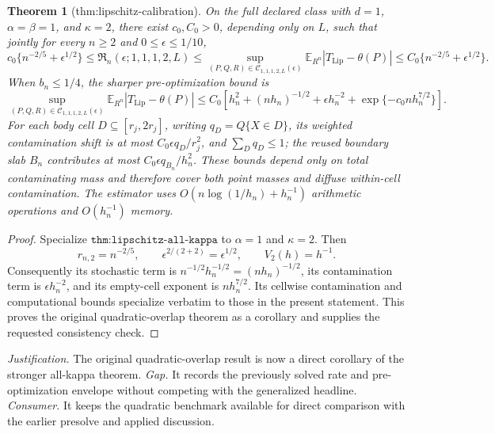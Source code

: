 \documentclass{article}
\newtheorem{theorem}{Theorem}
\begin{document}
\begin{theorem}[thm:lipschitz-calibration]\label{thm:lipschitz-calibration}
On the full declared class with \(d=1\), \(\alpha=\beta=1\), and \(\kappa=2\), there exist \(c_0,C_0>0\), depending only on \(L\), such that jointly for every \(n\geq2\) and \(0\leq\epsilon\leq1/10\), \[c_0\{n^{-2/5}+\epsilon^{1/2}\}\leq\mathfrak R_n(\epsilon;1,1,1,2,L)\leq\sup_{(P,Q,R)\in\mathcal C_{1,1,1,2,L}(\epsilon)}\mathbb E_{R^n}|T_{\mathrm{Lip}}-\theta(P)|\leq C_0\{n^{-2/5}+\epsilon^{1/2}\}.\] When \(b_n\leq1/4\), the sharper pre-optimization bound is \[\sup_{(P,Q,R)\in\mathcal C_{1,1,1,2,L}(\epsilon)}\mathbb E_{R^n}|T_{\mathrm{Lip}}-\theta(P)|\leq C_0\left[h_n^2+(nh_n)^{-1/2}+\epsilon h_n^{-2}+\exp\{-c_0nh_n^{7/2}\}\right].\] For each body cell \(D\subseteq[r_j,2r_j]\), writing \(q_D=Q\{X\in D\}\), its weighted contamination shift is at most \(C_0\epsilon q_D/r_j^2\), and \(\sum_Dq_D\leq1\); the reused boundary slab \(B_n\) contributes at most \(C_0\epsilon q_{B_n}/h_n^2\). These bounds depend only on total contaminating mass and therefore cover both point masses and diffuse within-cell contamination. The estimator uses \(O(n\log(1/h_n)+h_n^{-1})\) arithmetic operations and \(O(h_n^{-1})\) memory.
\end{theorem}
\begin{proof}
Specialize \(\texttt{thm:lipschitz-all-kappa}\) to \(\alpha=1\) and \(\kappa=2\). Then
\[
r_{n,2}=n^{-2/5},
\qquad
\epsilon^{2/(2+2)}=\epsilon^{1/2},
\qquad
V_2(h)=h^{-1}.
\]
Consequently its stochastic term is \(n^{-1/2}h_n^{-1/2}=(nh_n)^{-1/2}\), its contamination term is \(\epsilon h_n^{-2}\), and its empty-cell exponent is \(nh_n^{7/2}\). Its cellwise contamination and computational bounds specialize verbatim to those in the present statement. This proves the original quadratic-overlap theorem as a corollary and supplies the requested consistency check.
\end{proof}
\par\smallskip\noindent \textit{Justification.} The original quadratic-overlap result is now a direct corollary of the stronger all-kappa theorem. \textit{Gap.} It records the previously solved rate and pre-optimization envelope without competing with the generalized headline. \textit{Consumer.} It keeps the quadratic benchmark available for direct comparison with the earlier presolve and applied discussion.
\end{document}
